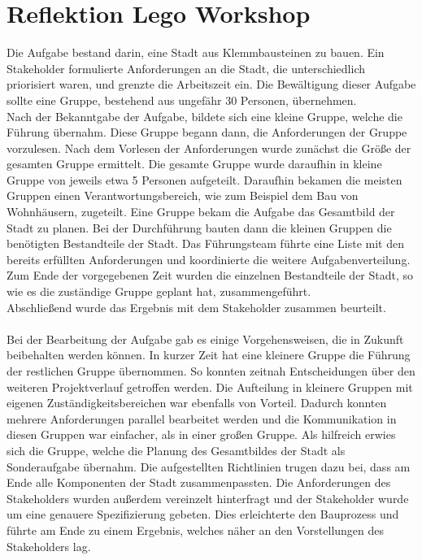 \documentclass{article}
\newcommand{\rnum}[1]{\uppercase\expandafter{\romannumeral #1\relax}}
\begin{document}
\section{Reflektion Lego Workshop \rnum{1}}
Die Aufgabe bestand darin, eine Stadt aus Klemmbausteinen zu bauen.
Ein Stakeholder formulierte Anforderungen an die Stadt, die unterschiedlich priorisiert waren, und grenzte die Arbeitszeit ein.
Die Bewältigung dieser Aufgabe sollte eine Gruppe, bestehend aus ungefähr 30 Personen, übernehmen.\\
Nach der Bekanntgabe der Aufgabe, bildete sich eine kleine Gruppe, welche die Führung übernahm.
Diese Gruppe begann dann, die Anforderungen der Gruppe vorzulesen.
Nach dem Vorlesen der Anforderungen wurde zunächst die Größe der gesamten Gruppe ermittelt.
Die gesamte Gruppe wurde daraufhin in kleine Gruppe von jeweils etwa 5 Personen aufgeteilt.
Daraufhin bekamen die meisten Gruppen einen Verantwortungsbereich, wie zum Beispiel dem Bau von Wohnhäusern, zugeteilt.
Eine Gruppe bekam die Aufgabe das Gesamtbild der Stadt zu planen.
Bei der Durchführung bauten dann die kleinen Gruppen die benötigten Bestandteile der Stadt.
Das Führungsteam führte eine Liste mit den bereits erfüllten Anforderungen und koordinierte die weitere Aufgabenverteilung.
Zum Ende der vorgegebenen Zeit wurden die einzelnen Bestandteile der Stadt, so wie es die zuständige Gruppe geplant hat, zusammengeführt.\\
Abschließend wurde das Ergebnis mit dem Stakeholder zusammen beurteilt.\\
\\
Bei der Bearbeitung der Aufgabe gab es einige Vorgehensweisen, die in Zukunft beibehalten werden können.
In kurzer Zeit hat eine kleinere Gruppe die Führung der restlichen Gruppe übernommen.
So konnten zeitnah Entscheidungen über den weiteren Projektverlauf getroffen werden.
Die Aufteilung in kleinere Gruppen mit eigenen Zuständigkeitsbereichen war ebenfalls von Vorteil.
Dadurch konnten mehrere Anforderungen parallel bearbeitet werden und die Kommunikation in diesen Gruppen war einfacher, als in einer großen Gruppe.
Als hilfreich erwies sich die Gruppe, welche die Planung des Gesamtbildes der Stadt als Sonderaufgabe übernahm.
Die aufgestellten Richtlinien trugen dazu bei, dass am Ende alle Komponenten der Stadt zusammenpassten.
Die Anforderungen des Stakeholders wurden außerdem vereinzelt hinterfragt und der Stakeholder wurde um eine genauere Spezifizierung gebeten.
Dies erleichterte den Bauprozess und führte am Ende zu einem Ergebnis, welches näher an den Vorstellungen des Stakeholders lag.
\end{document}

